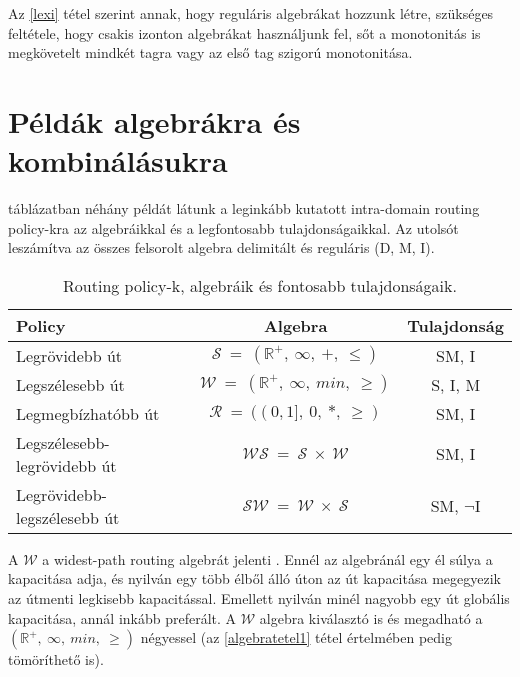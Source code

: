     Az \eqref{lexi} tétel szerint annak, hogy reguláris algebrákat hozzunk létre, szükséges feltétele, hogy csakis izonton algebrákat használjunk fel, sőt a monotonitás is megkövetelt mindkét tagra vagy az első tag szigorú monotonitása.

  \section{Példák algebrákra és kombinálásukra}\label{section_algebrapeldak}

   táblázatban néhány példát látunk a leginkább kutatott intra-domain routing policy-kra az algebráikkal és a legfontosabb tulajdonságaikkal. Az utolsót leszámítva az összes felsorolt algebra delimitált és reguláris (D, M, I).

  \begin{table}[ht]
    \footnotesize
    \centering
    \caption{Routing policy-k, algebráik és fontosabb tulajdonságaik.}
    \begin{tabular}{ | l | c | c |}
    \hline
    Policy & Algebra & Tulajdonság\\
    \hline
    Legrövidebb út & $\mathcal{S}~=~(\mathbb{R}^{+},~\infty,~+,~\leq)$ & SM, I\\
    Legszélesebb út & $\mathcal{W}~=~(\mathbb{R}^{+},~\infty,~min,~\geq)$ & S, I, M\\
    Legmegbízhatóbb út &  $\mathcal{R}~=~((0,1],~0,~*,~\geq)$ & SM, I\\
    Legszélesebb-legrövidebb út & $\mathcal{WS}~=~\mathcal{S}~\times~\mathcal{W}$ & SM, I\\
    Legrövidebb-legszélesebb út & $\mathcal{SW}~=~\mathcal{W}~\times~\mathcal{S}$ & SM, $\neg$I\\
    \hline
    \end{tabular}\label{tab:table_algebrapeldak}
  \end{table}

  A $\mathcal{W}$ a widest-path routing algebrát jelenti \cite{Quality_of_service_routing_for_supporting_multimedia_applications}. Ennél az algebránál egy él súlya a kapacitása adja, és nyilván egy több élből álló úton az út kapacitása megegyezik az útmenti legkisebb kapacitással. Emellett nyilván minél nagyobb egy út globális kapacitása, annál inkább preferált. A $\mathcal{W}$ algebra kiválasztó is és megadható a $(\mathbb{R}^{+},~\infty,~min,~\geq)$ négyessel (az \eqref{algebratetel1} tétel értelmében pedig tömöríthető is).

